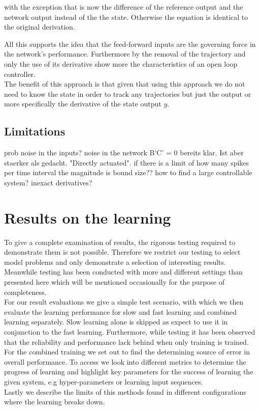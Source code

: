 with the exception that is now the difference of the reference output and the network output instead of the the state. Otherwise the equation is identical to the original derivation. \\

All this supports the idea that the feed-forward inputs are the governing force in the network's performance. Furthermore by the removal of the trajectory and only the use of its derivative show more the characteristics of an open loop controller.\\
The benefit of this approach is that given that using this approach we do not need to know the state in order to track any trajectories but just the output or more specifically the derivative of the state output $y$.\\


\subsection{Limitations}

prob noise in the inputs?
noise in the network
B'C' = 0 bereits klar. Ist aber staerker als gedacht. "Directly actuated".
if there is a limit of how many spikes per time interval the magnitude is bound
size?? how to find a large controllable system?
inexact derivatives?


\section{Results on the learning}

To give a complete examination of results, the rigorous testing required to demonstrate them is not possible. Therefore we restrict our testing to select model problems and only demonstrate a selection of interesting results. Meanwhile testing has been conducted with more and different settings than presented here which will be mentioned occasionally for the purpose of completeness.\\
For our result evaluations we give a simple test scenario, with which we then evaluate the learning performance for slow and fast learning and combined learning separately. Slow learning alone is skipped as \cite{bourdoukan_enforcing_2015} expect to use it in conjunction to the fast learning. Furthermore, while testing it has been observed that the reliability and performance lack behind when only training is trained.\\
For the combined training we set out to find the determining  source of error in overall performance. To access we look into different metrics to determine the progress of learning and highlight key parameters for the success of learning the given system, e.g hyper-parameters or learning input sequences.\\
Lastly we describe the limits of this methods found in different configurations where the learning breaks down.

